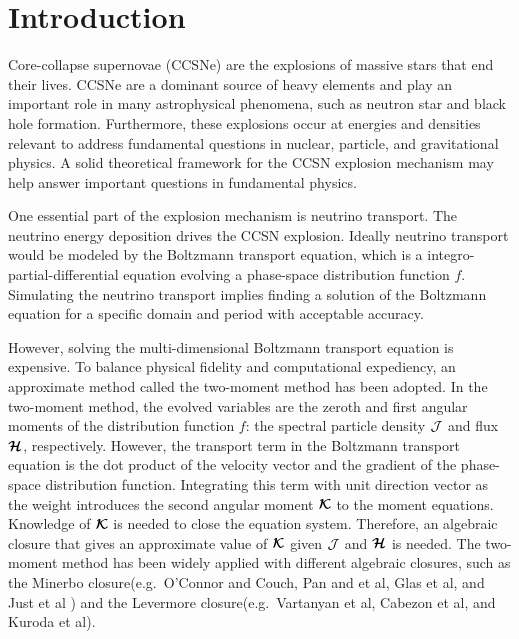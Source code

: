 \section{Introduction}

Core-collapse supernovae (CCSNe) are the explosions of massive stars that end their lives.
CCSNe are a dominant source of heavy elements and play an important role in many astrophysical phenomena, such as neutron star and black hole formation.  
Furthermore, these explosions occur at energies and densities relevant to address fundamental questions in nuclear, particle, and gravitational physics. 
A solid theoretical framework for the CCSN explosion mechanism may help answer important questions in fundamental physics.\cite{janka_etal_2007}

One essential part of the explosion mechanism is neutrino transport.
The neutrino energy deposition drives the CCSN explosion.\cite{mezzacappaMesser_1999}
Ideally neutrino transport would be modeled by the Boltzmann transport equation, which is a integro-partial-differential equation evolving a phase-space distribution function $f$.\cite{Bruenn_1985}
Simulating the neutrino transport implies finding a solution of the Boltzmann equation for a specific domain and period with acceptable accuracy.

However, solving the multi-dimensional Boltzmann transport equation is expensive.
To balance physical fidelity and computational expediency, an approximate method called the two-moment method has been adopted.\cite{mezzacappaMesser_1999}
In the two-moment method, the evolved variables are the zeroth and first angular moments of the distribution function $f$: the spectral particle density $\mathcal{J}$ and flux $\boldsymbol{\mathcal{H}}$, respectively.
However, the transport term in the Boltzmann transport equation is the dot product of the velocity vector and the gradient of the phase-space distribution function.
Integrating this term with unit direction vector as the weight introduces the second angular moment $\boldsymbol{\mathcal{K}}$ to the moment equations.
Knowledge of $\boldsymbol{\mathcal{K}}$ is needed to close the equation system.
Therefore, an algebraic closure that gives an approximate value of $\boldsymbol{\mathcal{K}}$ given $\mathcal{J}$ and $\boldsymbol{\mathcal{H}}$ is needed.
The two-moment method has been widely applied with different algebraic closures, such as the Minerbo\cite{minerbo_1978} closure(e.g.~{O'Connor} and {Couch}\cite{oConnorCouch_2018}, Pan and et al\cite{pan_etal_2018}, Glas et al\cite{glas_etal_2018}, and Just et al\cite{just_etal_2018} ) and the Levermore\cite{levermore_1984} closure(e.g.~Vartanyan et al\cite{vartanyan_etal_2018}, Cabezon et al\cite{cabezon_etal_2018}, and Kuroda et al\cite{kuroda_etal_2016}). 

